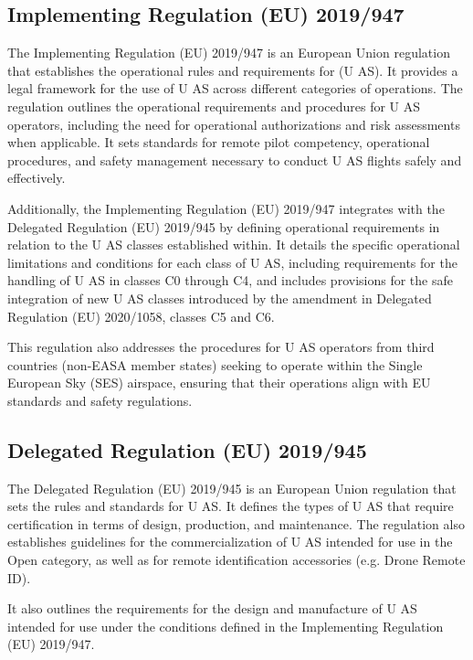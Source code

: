 \subsection{Implementing Regulation (EU) 2019/947}

The Implementing Regulation (EU) 2019/947 is an European Union regulation that establishes the operational rules and requirements for (U AS). It provides a legal framework for the use of U AS across different categories of operations. The regulation outlines the operational requirements and procedures for U AS operators, including the need for operational authorizations and risk assessments when applicable. It sets standards for remote pilot competency, operational procedures, and safety management necessary to conduct U AS flights safely and effectively.

Additionally, the Implementing Regulation (EU) 2019/947 integrates with the Delegated Regulation (EU) 2019/945 by defining operational requirements in relation to the U AS classes established within. It details the specific operational limitations and conditions for each class of U AS, including requirements for the handling of U AS in classes C0 through C4, and includes provisions for the safe integration of new U AS classes introduced by the amendment in Delegated Regulation (EU) 2020/1058, classes C5 and C6.

This regulation also addresses the procedures for U AS operators from third countries (non-EASA member states) seeking to operate within the Single European Sky (SES) airspace, ensuring that their operations align with EU standards and safety regulations.

\subsection{Delegated Regulation (EU) 2019/945}

The Delegated Regulation (EU) 2019/945 is an European Union regulation that sets the rules and standards for U AS. It defines the types of U AS that require certification in terms of design, production, and maintenance. The regulation also establishes guidelines for the commercialization of U AS intended for use in the Open category, as well as for remote identification accessories (e.g. Drone Remote ID).

It also outlines the requirements for the design and manufacture of U AS intended for use under the conditions defined in the Implementing Regulation (EU) 2019/947.

